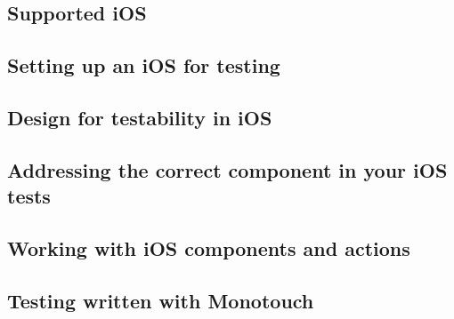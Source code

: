 

\subsection{Supported iOS \gdauts{}}


\subsection{Setting up an iOS \gdaut{} for testing}
\label{ToolkitiOSSetup}


\subsection{Design for testability in iOS \gdauts{}}
\label{ToolkitiOSDFT}


\subsection{Addressing the correct component in your iOS tests}
\label{ToolkitiOSCorrectComponent}


\subsection{Working with iOS components and actions}


\subsection{Testing \gdauts{} written with Monotouch}

